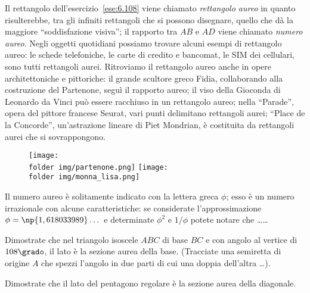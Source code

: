 Il rettangolo dell'esercizio~\ref{ese:6.108} viene chiamato 
\emph{rettangolo aureo} in quanto risulterebbe, tra gli infiniti 
rettangoli che si possono disegnare, quello che dà la maggiore 
``soddisfazione visiva''; il rapporto tra \(AB\) e \(AD\) viene chiamato 
\emph{numero aureo}. 
Negli oggetti quotidiani possiamo trovare alcuni esempi di rettangolo 
aureo: le schede telefoniche, le carte di credito e bancomat, le SIM 
dei cellulari, sono tutti rettangoli aurei.
Ritroviamo il rettangolo aureo anche in opere architettoniche e 
pittoriche: il grande scultore greco Fidia, collaborando alla 
costruzione del Partenone, seguì il rapporto aureo; il viso della 
Gioconda di Leonardo da Vinci può essere racchiuso in un rettangolo 
aureo; nella ``Parade'', opera del pittore francese Seurat, vari 
punti delimitano rettangoli aurei; ``Place de la Concorde'', 
un'astrazione lineare di Piet Mondrian, è costituita da rettangoli 
aurei che si sovrappongono.

\begin{figure*}[!htb]
	
\centering\texttt{[image: \\folder img/partenone.png]}
\qquad\texttt{[image: \\folder img/monna\_lisa.png]}
\end{figure*}

\begin{esercizio}
\label{ese:6.109}
Il numero aureo è solitamente indicato con la lettera greca \(\phi\); 
esso è un numero irrazionale con alcune caratteristiche: se 
considerate l'approssimazione \(\phi=\np{1,618033989}\ldots{}\) e 
determinate \(\phi^2\) e \(1/\phi\) potete notare che \ldots\ldots{}
\end{esercizio}

\begin{esercizio}
\label{ese:6.110}
Dimostrate che nel triangolo isoscele \(ABC\) di base \(BC\) e con angolo 
al vertice di \(108\grado\), il lato è la sezione aurea della base. 
(Tracciate una semiretta di origine \(A\) che spezzi l'angolo in due 
parti di cui una doppia dell'altra \ldots{}).
\end{esercizio}

\begin{esercizio}
\label{ese:6.111}
Dimostrate che il lato del pentagono regolare è la sezione aurea 
della diagonale.
\end{esercizio}

